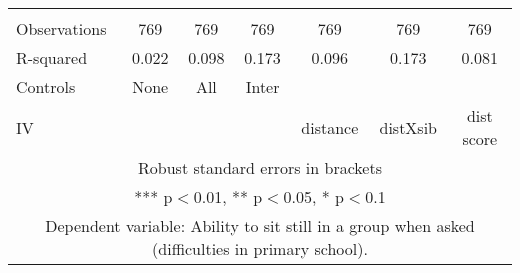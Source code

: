 \begin{tabular}{lcccccc}
 &  &  &  &  &  &  \\
Observations & 769 & 769 & 769 & 769 & 769 & 769 \\
R-squared & 0.022 & 0.098 & 0.173 & 0.096 & 0.173 & 0.081 \\
Controls & None & All & Inter &  &  &  \\
 IV &  &  &  & distance & distXsib & dist score \\ \hline
\multicolumn{7}{c}{ Robust standard errors in brackets} \\
\multicolumn{7}{c}{ *** p$<$0.01, ** p$<$0.05, * p$<$0.1} \\
\multicolumn{7}{c}{ Dependent variable: Ability to sit still in a group when asked (difficulties in primary school).} \\
\end{tabular}
